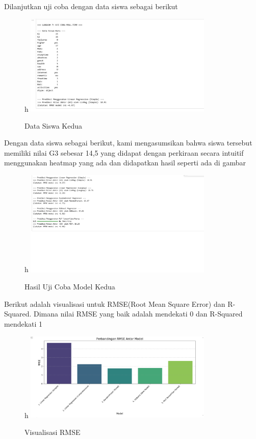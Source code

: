 Dilanjutkan uji coba dengan data siswa sebagai berikut

\begin{figure}{h}
    \centering
    \includegraphics[width=0.8\textwidth]{images/datasiswa1.png}
    \caption{Data Siswa Kedua}
    \label{fig:hasil}
\end{figure}

Dengan data siswa sebagai berikut, kami mengasumsikan bahwa siswa tersebut memiliki nilai G3 sebesar 14,5 yang didapat dengan perkiraan secara intuitif
menggunakan heatmap yang ada dan didapatkan hasil seperti ada di gambar 

\begin{figure}{h}
    \centering
    \includegraphics[width=0.8\textwidth]{images/hasil1.png}
    \caption{Hasil Uji Coba Model Kedua}
    \label{fig:hasil}
\end{figure}


Berikut adalah visualisasi untuk RMSE(Root Mean Square Error) dan R-Squared. Dimana nilai RMSE yang baik adalah mendekati 0 dan R-Squared mendekati 1

\begin{figure}{h}
    \centering
    \includegraphics[width=0.8\textwidth]{images/rmse.png}
    \caption{Visualisasi RMSE}
    \label{fig:hasil}
\end{figure}


